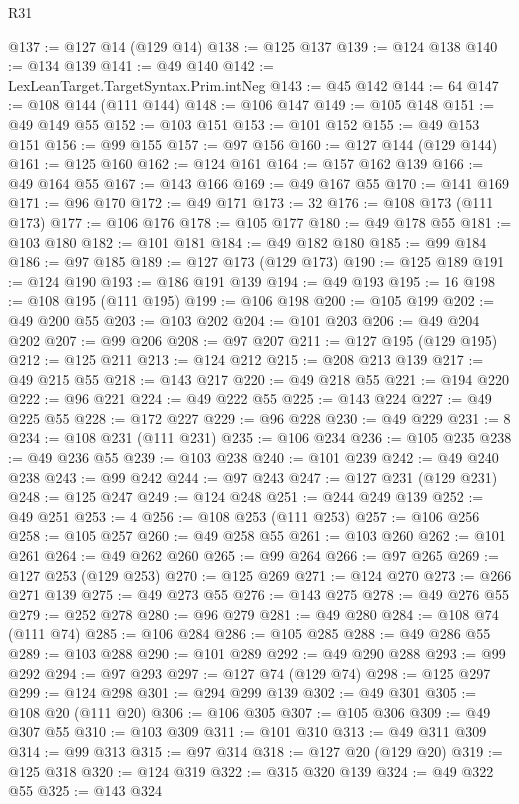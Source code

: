 \begin{lexlean}{R31}
\begin{coremodule}
@137 := @127 @14 (@129 @14)
@138 := @125 @137
@139 := @124 @138
@140 := @134 @139
@141 := @49 @140
@142 := LexLeanTarget.TargetSyntax.Prim.intNeg
@143 := @45 @142
@144 := 64
@147 := @108 @144 (@111 @144)
@148 := @106 @147
@149 := @105 @148
@151 := @49 @149 @55
@152 := @103 @151
@153 := @101 @152
@155 := @49 @153 @151
@156 := @99 @155
@157 := @97 @156
@160 := @127 @144 (@129 @144)
@161 := @125 @160
@162 := @124 @161
@164 := @157 @162 @139
@166 := @49 @164 @55
@167 := @143 @166
@169 := @49 @167 @55
@170 := @141 @169
@171 := @96 @170
@172 := @49 @171
@173 := 32
@176 := @108 @173 (@111 @173)
@177 := @106 @176
@178 := @105 @177
@180 := @49 @178 @55
@181 := @103 @180
@182 := @101 @181
@184 := @49 @182 @180
@185 := @99 @184
@186 := @97 @185
@189 := @127 @173 (@129 @173)
@190 := @125 @189
@191 := @124 @190
@193 := @186 @191 @139
@194 := @49 @193
@195 := 16
@198 := @108 @195 (@111 @195)
@199 := @106 @198
@200 := @105 @199
@202 := @49 @200 @55
@203 := @103 @202
@204 := @101 @203
@206 := @49 @204 @202
@207 := @99 @206
@208 := @97 @207
@211 := @127 @195 (@129 @195)
@212 := @125 @211
@213 := @124 @212
@215 := @208 @213 @139
@217 := @49 @215 @55
@218 := @143 @217
@220 := @49 @218 @55
@221 := @194 @220
@222 := @96 @221
@224 := @49 @222 @55
@225 := @143 @224
@227 := @49 @225 @55
@228 := @172 @227
@229 := @96 @228
@230 := @49 @229
@231 := 8
@234 := @108 @231 (@111 @231)
@235 := @106 @234
@236 := @105 @235
@238 := @49 @236 @55
@239 := @103 @238
@240 := @101 @239
@242 := @49 @240 @238
@243 := @99 @242
@244 := @97 @243
@247 := @127 @231 (@129 @231)
@248 := @125 @247
@249 := @124 @248
@251 := @244 @249 @139
@252 := @49 @251
@253 := 4
@256 := @108 @253 (@111 @253)
@257 := @106 @256
@258 := @105 @257
@260 := @49 @258 @55
@261 := @103 @260
@262 := @101 @261
@264 := @49 @262 @260
@265 := @99 @264
@266 := @97 @265
@269 := @127 @253 (@129 @253)
@270 := @125 @269
@271 := @124 @270
@273 := @266 @271 @139
@275 := @49 @273 @55
@276 := @143 @275
@278 := @49 @276 @55
@279 := @252 @278
@280 := @96 @279
@281 := @49 @280
@284 := @108 @74 (@111 @74)
@285 := @106 @284
@286 := @105 @285
@288 := @49 @286 @55
@289 := @103 @288
@290 := @101 @289
@292 := @49 @290 @288
@293 := @99 @292
@294 := @97 @293
@297 := @127 @74 (@129 @74)
@298 := @125 @297
@299 := @124 @298
@301 := @294 @299 @139
@302 := @49 @301
@305 := @108 @20 (@111 @20)
@306 := @106 @305
@307 := @105 @306
@309 := @49 @307 @55
@310 := @103 @309
@311 := @101 @310
@313 := @49 @311 @309
@314 := @99 @313
@315 := @97 @314
@318 := @127 @20 (@129 @20)
@319 := @125 @318
@320 := @124 @319
@322 := @315 @320 @139
@324 := @49 @322 @55
@325 := @143 @324

\end{coremodule}
\end{lexlean}
